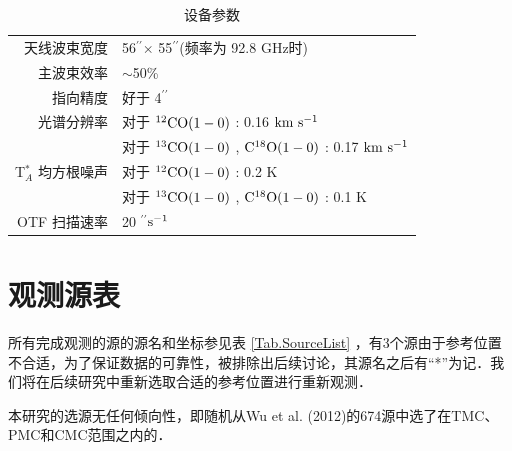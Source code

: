 \documentclass[UTF8, nocolorlinks]{pkuthss}
\newcommand{\coaa}{$\rm^{12}CO(1-0)$ }
\newcommand{\cobb}{$\rm^{13}CO(1-0)$ }
\newcommand{\cocc}{$\rm C^{18}O(1-0)$ }
\newcommand{\kms}{$\rm km\ s^{-1}$}
\newcommand{\arcsec}{$^{\prime\prime}$}
\begin{document}
		\begin{table}[H]
	        \begin{center}
	        \caption{设备参数\label{Tab.Observation}}
	        \setlength{\tabcolsep}{0.1in}
	        \vspace{0.5em}
	        \begin{tabular}{rl}
	        \toprule
	        \hline
	        天线波束宽度              & 56\arcsec$\times$ 55\arcsec (频率为 92.8 GHz时) \\
	        主波束效率                & $\sim$50\%                               \\
	        指向精度                & 好于 4\arcsec                     \\
	        光谱分辨率               & 对于 \coaa: 0.16 \kms                     \\
	                                & 对于 \cobb, \cocc:  0.17 \kms           \\
	        T$^*_A$ 均方根噪声       & 对于 \coaa: 0.2 K                         \\
	                                & 对于 \cobb, \cocc: 0.1 K               \\
	        OTF 扫描速率            & 20 \arcsec $\rm s^{-1}$\\
	        \hline
	        \bottomrule
	        \end{tabular}
	        \end{center}
        \end{table}

    \section{观测源表}
        所有完成观测的源的源名和坐标参见表 \ref{Tab.SourceList} ，有3个源由于参考位置不合适，为了保证数据的可靠性，被排除出后续讨论，其源名之后有“*”为记．我们将在后续研究中重新选取合适的参考位置进行重新观测．

        本研究的选源无任何倾向性，即随机从Wu et al. (2012)的674源中选了在TMC、PMC和CMC范围之内的\supercite{wu2012gas}．
\end{document}
